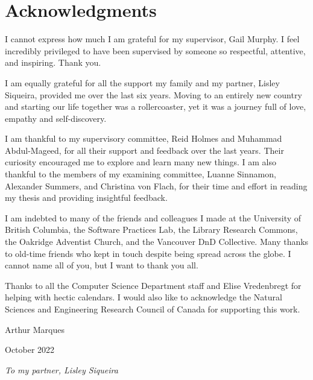 
\chapter{Acknowledgments}



I cannot express how much I am grateful for my supervisor, Gail Murphy. I feel incredibly privileged to have been supervised by someone so respectful, attentive, and inspiring. Thank you. 

I am equally grateful for all the support my family and my partner, Lisley Siqueira, provided me over the last six years. Moving to an entirely new country and starting our life together was a rollercoaster, yet it was a journey full of love, empathy and self-discovery. 

I am thankful to my supervisory committee, Reid Holmes and Muhammad Abdul-Mageed, for all their support and feedback over the last years. Their curiosity encouraged me to explore and learn many new things. I am also thankful to the members of my examining committee, Luanne Sinnamon, Alexander Summers, and Christina von Flach, for their time and effort in reading my thesis and providing insightful feedback. 

I am indebted to many of the friends and colleagues I made at the University of British Columbia, the Software Practices Lab, the Library Research Commons, the Oakridge Adventist Church, and the Vancouver DnD Collective. Many thanks to old-time friends who kept in touch despite being spread across the globe. I cannot name all of you, but I want to thank you all.


Thanks to all the Computer Science Department staff and Elise Vredenbregt for helping with hectic calendars. I would also like to acknowledge the Natural Sciences and Engineering Research Council of Canada for supporting this work. 


\begin{flushright}
Arthur Marques

October 2022
\end{flushright}


\clearpage

\thispagestyle{empty}
\vspace*{\fill}
\begin{flushright}
\emph{To my partner, Lisley Siqueira}
\end{flushright}
\vspace*{\fill}




